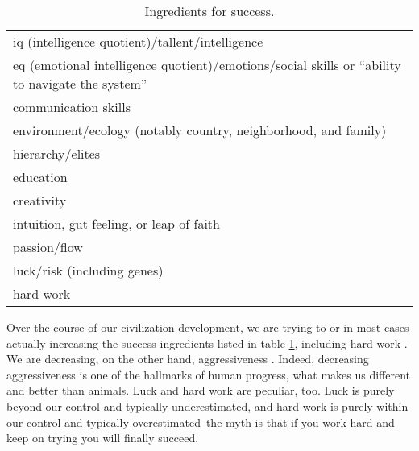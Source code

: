 \documentclass[11pt, letterpaper]{article}
\begin{document}
\begin{spacing}{2.0}
\begin{table}[H]\centering\footnotesize
\caption{\label{tabSuc} Ingredients for success.} 
\begin{tabular}{l}\hline 
iq (intelligence quotient)/tallent/intelligence \citep{herrnstein10}\\
eq (emotional intelligence quotient)/emotions/social skills or ``ability to navigate the system'' \citep{goleman06}\\ 
communication skills \citep{grant13,trump09}\\ %
environment/ecology (notably country, neighborhood, and family) \citep{fischer96}\\
hierarchy/elites \citep{mills99}\\ %
education \citep{becker09}\\
creativity \citep{florida08}\\
intuition, gut feeling, or leap of faith \citep{dane07,bezos10, jobs05,walker14}\\ 
passion/flow \citep{csikszentmihalyi91, vallerand07}\\  
luck/risk (including genes) \citep{frank12,frank16}\\
hard work \citep{andrews05,duckworth13}\\\hline
\end{tabular}\end{table}

Over the course of our civilization development, we are trying to
or in most cases actually increasing the success ingredients listed in table
\ref{tabSuc}, including hard work \citep{schor08}. %
 We are decreasing, on the other hand, aggressiveness \citep{freud30}. %
 Indeed, decreasing aggressiveness is one of the hallmarks of human progress, what
makes us different and better than animals. Luck and hard work are
peculiar, too. Luck is purely beyond our control and typically
underestimated, and hard work is purely within our control and typically
overestimated--the myth is that if you work hard and keep on trying you will
finally succeed.  


\end{spacing}
\end{document}
